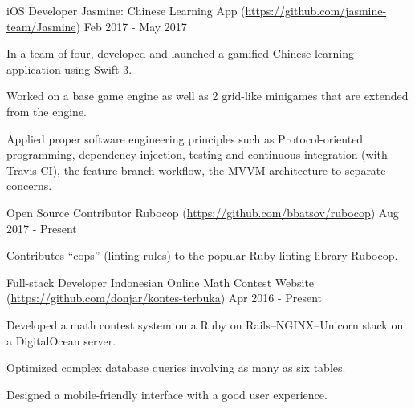 

\begin{cventries}

	\cventry
	{iOS Developer} %
	{Jasmine: Chinese Learning App (\url{https://github.com/jasmine-team/Jasmine})} %
	{} %
	{Feb 2017 - May 2017} %
	{
		\begin{cvitems} %
		\item {In a team of four, developed and launched a gamified Chinese learning application using Swift 3.}
		\item {Worked on a base game engine as well as 2 grid-like minigames that are extended from the engine.}
		\item {Applied proper software engineering principles such as Protocol-oriented programming, dependency injection, testing and continuous integration (with Travis CI), the feature branch workflow, the MVVM architecture to separate concerns.}
		\end{cvitems}
	}

	\cventry
	{Open Source Contributor} %
	{Rubocop (\url{https://github.com/bbatsov/rubocop})} %
	{} %
	{Aug 2017 - Present} %
	{
		\begin{cvitems} %
		\item {Contributes ``cops'' (linting rules) to the popular Ruby linting library Rubocop.}
		\end{cvitems}
	}

	\cventry
	{Full-stack Developer} %
	{Indonesian Online Math Contest Website (\url{https://github.com/donjar/kontes-terbuka})} %
	{} %
	{Apr 2016 - Present} %
	{
		\begin{cvitems} %
		\item {Developed a math contest system on a Ruby on Rails--NGINX--Unicorn stack on a DigitalOcean server.}
		\item {Optimized complex database queries involving as many as six tables.}
		\item {Designed a mobile-friendly interface with a good user experience.}
		\end{cvitems}
	}

\end{cventries}
